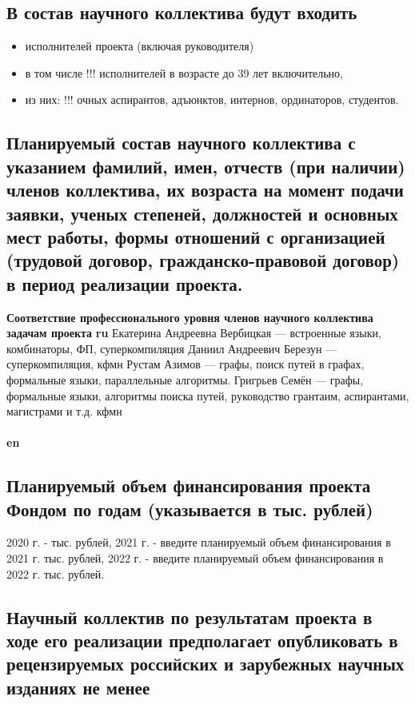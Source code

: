 \documentclass[12pt]{article}  %
\theoremstyle{remark}
\begin{document}
\subsection{В состав научного коллектива будут входить}
%
\begin{itemize}
\item исполнителей проекта (включая руководителя)
\item в том числе !!!  исполнителей в возрасте до 39 лет включительно,
\item из них: !!! очных аспирантов, адъюнктов, интернов, ординаторов, студентов.
\end{itemize}

\subsection{Планируемый состав научного коллектива с указанием фамилий, имен, отчеств (при наличии) членов коллектива, их возраста на момент подачи заявки, ученых степеней, должностей и основных мест работы, формы отношений с организацией (трудовой договор, гражданско-правовой договор) в период реализации проекта.}


\textbf{Соответствие профессионального уровня членов научного коллектива задачам проекта}
\textbf{ru}
Екатерина Андреевна Вербицкая --- встроенные языки, комбинаторы, ФП, суперкомпиляция
Даниил Андреевич Березун --- суперкомпиляция, кфмн
Рустам Азимов --- графы, поиск путей в графах, формальные языки, параллельные алгоритмы.
Григрьев Семён --- графы, формальные языки, алгоритмы поиска путей, руководство грантаим, аспирантами, магистрами и т.д. кфмн
\\
\\
\textbf{en}

\subsection{Планируемый объем финансирования проекта Фондом по годам (указывается в тыс. рублей)}
2020 г. - тыс. рублей,
2021 г. - введите планируемый объем финансирования в 2021 г. тыс. рублей,
2022 г. - введите планируемый объем финансирования в 2022 г. тыс. рублей.

\subsection{Научный коллектив по результатам проекта в ходе его реализации предполагает опубликовать в рецензируемых российских и зарубежных научных изданиях не менее}
\end{document}
